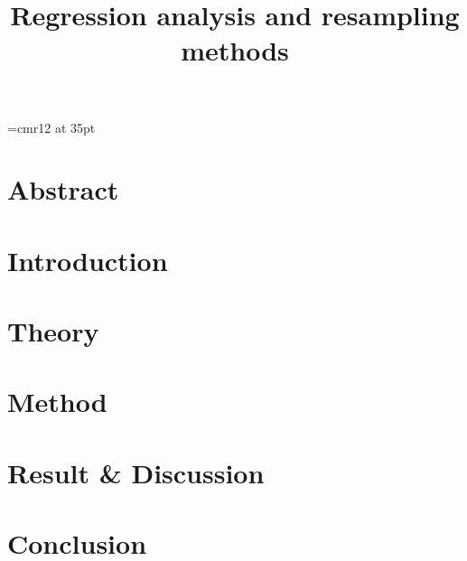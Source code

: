 
\font\myfont=cmr12 at 35pt
\title{\textbf{{\myfont Regression analysis and resampling methods}}}

\mnfrontpage


\pagestyle{fancy}
\fancyhf{}
\fancyfoot[CE,LO]{\leftmark}

\renewcommand{\headrulewidth}{2pt}
\renewcommand{\footrulewidth}{1pt}

\tableofcontents



\pagebreak
\pagebreak
\section*{Abstract}%

\cite{compphys}


\section{Introduction}



\section{Theory}\label{sec:theory}


\label{sec:lalalla}
\label{eq:lalalla}
\label{tab:lalalla}
\label{fig:lalalla}


\section{Method}



\pagebreak
\section{Result \& Discussion}




%


\section{Conclusion}



